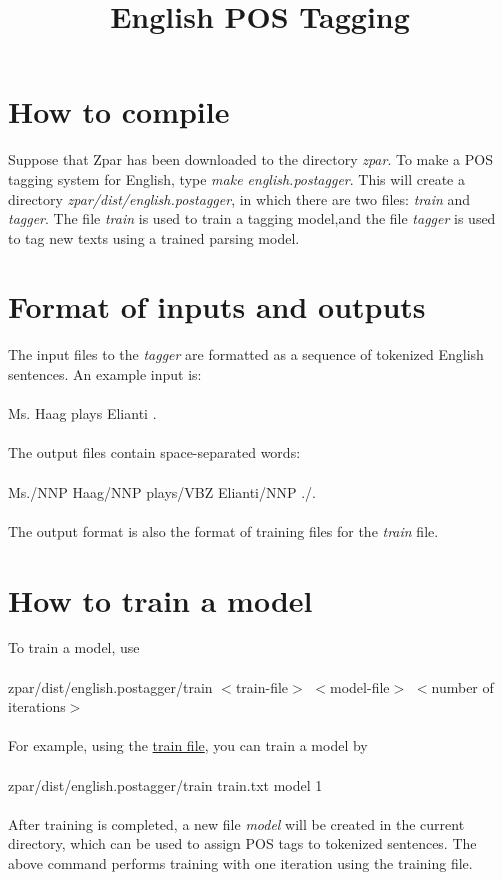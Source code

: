 \documentclass[12pt]{article}
\title{English POS Tagging}
\begin{document}
\begin{CJK}{GBK}{song}
\maketitle

\section{How to compile}
Suppose that Zpar has been downloaded to the directory \textit{zpar}. To make a POS tagging system for English, type \textit{make english.postagger}. This will create a directory \textit{zpar/dist/english.postagger}, in which there are two files: \textit{train} and \textit{tagger}. The file \textit{train} is used to train a tagging model,and the file \textit{tagger} is used to tag new texts using a trained parsing model.
\section{Format of inputs and outputs}
The input files to the \textit{tagger} are formatted as a sequence of tokenized English sentences. An example input is:
\\
\\
\hspace{3cm} Ms. Haag plays Elianti .
\\
\\
The output files contain space-separated words:
\\
\\
\hspace{3cm} Ms./NNP Haag/NNP plays/VBZ Elianti/NNP ./.
\\
\\
The output format is also the format of training files for the \textit{train} file.
\section{How to train a model}
To train a model, use
\\
\\
\hspace{3cm} zpar/dist/english.postagger/train $<$train-file$>$ $<$model-file$>$ $<$number of iterations$>$ \\
\\
For example, using the \href{eng_pos_files/train.txt}{train file}, you can train a  model by
\\
\\
\hspace{3cm} zpar/dist/english.postagger/train train.txt model 1 \\
\\
After training is completed, a new file \textit{model} will be created in the current directory, which can be used to assign POS tags to tokenized sentences. The above command performs training with one iteration using the training file.

\end{CJK}
\end{document}
